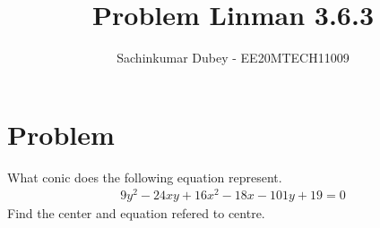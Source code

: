 \documentclass[journal,12pt,twocolumn]{IEEEtran}
\begin{document}
\def\putbox#1#2#3{\makebox[0in][l]{\makebox[#1][l]{}\raisebox{\baselineskip}[0in][0in]{\raisebox{#2}[0in][0in]{#3}}}}
     \def\rightbox#1{\makebox[0in][r]{#1}}
     \def\centbox#1{\makebox[0in]{#1}}
     \def\topbox#1{\raisebox{-\baselineskip}[0in][0in]{#1}}
     \def\midbox#1{\raisebox{-0.5\baselineskip}[0in][0in]{#1}}
\vspace{3cm}
\title{Problem Linman 3.6.3}
\author{Sachinkumar Dubey - EE20MTECH11009}
\maketitle
\newpage
\bigskip

\section{Problem}
What conic does the following equation represent.
\begin{align}
9y^2-24xy+16x^2-18x-101y+19=0
\end{align}
Find the center and equation refered to centre.
\end{document}
